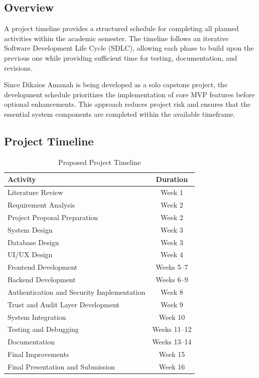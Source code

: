 \subsection{Overview}

A project timeline provides a structured schedule for completing all planned activities within the academic semester. The timeline follows an iterative Software Development Life Cycle (SDLC), allowing each phase to build upon the previous one while providing sufficient time for testing, documentation, and revisions.

Since Dikaios Amanah is being developed as a solo capstone project, the development schedule prioritizes the implementation of core MVP features before optional enhancements. This approach reduces project risk and ensures that the essential system components are completed within the available timeframe.


\subsection{Project Timeline}

\begin{table}[H]
\centering
\small
\begin{tabular}{|p{6cm}|c|}
\hline
\textbf{Activity} & \textbf{Duration} \\
\hline
Literature Review & Week 1 \\
\hline
Requirement Analysis & Week 2 \\
\hline
Project Proposal Preparation & Week 2 \\
\hline
System Design & Week 3 \\
\hline
Database Design & Week 3 \\
\hline
UI/UX Design & Week 4 \\
\hline
Frontend Development & Weeks 5--7 \\
\hline
Backend Development & Weeks 6--9 \\
\hline
Authentication and Security Implementation & Week 8 \\
\hline
Trust and Audit Layer Development & Week 9 \\
\hline
System Integration & Week 10 \\
\hline
Testing and Debugging & Weeks 11--12 \\
\hline
Documentation & Weeks 13--14 \\
\hline
Final Improvements & Week 15 \\
\hline
Final Presentation and Submission & Week 16 \\
\hline
\end{tabular}
\caption{Proposed Project Timeline}
\end{table}

